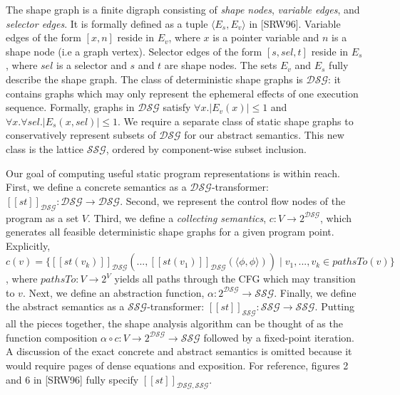 \documentclass{article}
\begin{document}
The shape graph is a finite digraph consisting of \textit{shape nodes},
\textit{variable edges}, and \textit{selector edges}. It is formally defined
as a tuple $\langle E_s, E_v \rangle$ in [SRW96]. Variable edges of the form
$[x, n]$ reside in $E_v$, where $x$ is a pointer variable and $n$ is a shape
node (i.e a graph vertex). Selector edges of the form $[s, sel, t]$ reside
in $E_s$, where $sel$ is a selector and $s$ and $t$ are shape nodes. The
sets $E_v$ and $E_s$ fully describe the shape graph. The class of
deterministic shape graphs is $\mathcal{DSG}$: it contains graphs which may
only represent the ephemeral effects of one execution sequence.  Formally,
graphs in $\mathcal{DSG}$ satisfy $\forall x.  |E_v(x)| \leq 1$ and $\forall
x.  \forall sel. |E_s(x, sel)| \leq 1$. We require a separate class of
static shape graphs to conservatively represent subsets of $\mathcal{DSG}$
for our abstract semantics. This new class is the lattice $\mathcal{SSG}$,
ordered by component-wise subset inclusion. 

Our goal of computing useful static program representations is within reach.
First, we define a concrete semantics as a
$\mathcal{DSG}$-transformer: $[\![st]\!]_{\mathcal{DSG}}: \mathcal{DSG}
\rightarrow \mathcal{DSG}$.  Second, we represent the control flow nodes of
the program as a set $V$.  Third, we define a \textit{collecting semantics},
$c : V \rightarrow 2^{\mathcal{DSG}}$, which generates all feasible
deterministic shape graphs for a given program point. Explicitly, $c(v) =
\{[\![st(v_k)]\!]_{\mathcal{DSG}}(...,
[\![st(v_1)]\!]_{\mathcal{DSG}}(\langle \phi, \phi \rangle)) \mid v_1, ...,
v_k \in pathsTo(v)\}$, where $pathsTo : V \rightarrow 2^V$ yields all paths
through the CFG which may transition to $v$. Next, we define an abstraction
function, $\alpha : 2^{\mathcal{DSG}} \rightarrow \mathcal{SSG}$. Finally,
we define the abstract semantics as a $\mathcal{SSG}$-transformer:
$[\![st]\!]_{\mathcal{SSG}}: \mathcal{SSG} \rightarrow \mathcal{SSG}$.
Putting all the pieces together, the shape analysis algorithm can be thought
of as the function composition $\alpha \circ c : V \rightarrow
2^{\mathcal{DSG}} \rightarrow \mathcal{SSG}$ followed by a fixed-point
iteration. A discussion of the exact concrete and abstract semantics is
omitted because it would require pages of dense equations and exposition.
For reference, figures 2 and 6 in [SRW96] fully specify 
$[\![st]\!]_{\mathcal{DSG}, \mathcal{SSG}}$.
\end{document}
